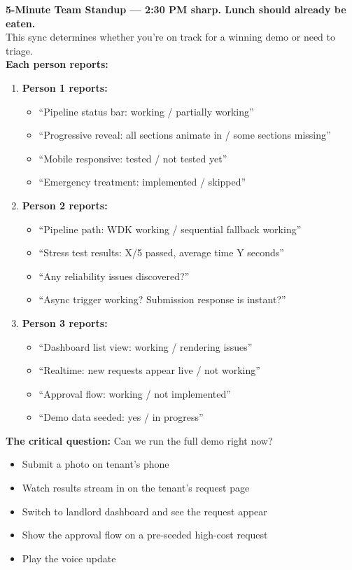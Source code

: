 \documentclass[11pt, a4paper]{article}
\begin{document}
\begin{syncbox}
{\large\textbf{5-Minute Team Standup --- 2:30 PM sharp. Lunch should already be eaten.}}\\[8pt]

This sync determines whether you're on track for a winning demo or need to triage.\\[6pt]

\textbf{Each person reports:}
\begin{enumerate}[leftmargin=2em, itemsep=4pt]
  \item \textbf{Person 1 reports:}
    \begin{itemize}[itemsep=1pt]
      \item ``Pipeline status bar: working / partially working''
      \item ``Progressive reveal: all sections animate in / some sections missing''
      \item ``Mobile responsive: tested / not tested yet''
      \item ``Emergency treatment: implemented / skipped''
    \end{itemize}
  \item \textbf{Person 2 reports:}
    \begin{itemize}[itemsep=1pt]
      \item ``Pipeline path: WDK working / sequential fallback working''
      \item ``Stress test results: X/5 passed, average time Y seconds''
      \item ``Any reliability issues discovered?''
      \item ``Async trigger working? Submission response is instant?''
    \end{itemize}
  \item \textbf{Person 3 reports:}
    \begin{itemize}[itemsep=1pt]
      \item ``Dashboard list view: working / rendering issues''
      \item ``Realtime: new requests appear live / not working''
      \item ``Approval flow: working / not implemented''
      \item ``Demo data seeded: yes / in progress''
    \end{itemize}
\end{enumerate}

\vspace{4pt}
\textbf{The critical question:} Can we run the full demo right now?
\begin{itemize}[leftmargin=1.5em, itemsep=2pt]
  \item Submit a photo on tenant's phone
  \item Watch results stream in on the tenant's request page
  \item Switch to landlord dashboard and see the request appear
  \item Show the approval flow on a pre-seeded high-cost request
  \item Play the voice update
\end{itemize}


\end{syncbox}
\end{document}
